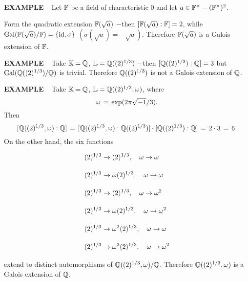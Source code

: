 \vspace{0.1cm}

\begin{x}{\small\bf EXAMPLE} \ %
Let $\mathbb{F}$ be a field of characteristic 0 and let $a \in \mathbb{F}^\times - (\mathbb{F}^\times)^2$.

Form the quadratic extension $\mathbb{F}(\sqrt{a})$ $-$then $[\mathbb{F}(\sqrt{a}):\mathbb{F}] = 2$, while 
$\text{Gal}(\mathbb{F}(\sqrt{a}) / \mathbb{F}) = \{\text{id},\sigma\}$ $(\sigma(\sqrt{a}) = - \sqrt{a})$.  
Therefore $\mathbb{F}(\sqrt{a})$ is a Galois extension of $\mathbb{F}$.
\end{x}

\vspace{0.1cm}

\begin{x}{\small\bf EXAMPLE} \ %
Take $\mathbb{K} = \mathbb{Q}$, $\mathbb{L} = \mathbb{Q}((2)^{1/3})$ $-$then $[\mathbb{Q}((2)^{1/3}):\mathbb{Q}] = 3$ but 
$\text{Gal}(\mathbb{Q}((2)^{1/3}) / \mathbb{Q})$ is trivial.  Therefore $\mathbb{Q}((2)^{1/3})$ is not a Galois extension of $\mathbb{Q}$.
\end{x}

\vspace{0.1cm}

\begin{x}{\small\bf EXAMPLE} \ %
Take $\mathbb{K} = \mathbb{Q}$, $\mathbb{L} = \mathbb{Q}((2)^{1/3}, \omega)$, where 
\[
\omega \hspace{0.05cm} = \hspace{0.05cm} \exp(2 \pi \sqrt{-1} / 3).
\]
Then
\[
[\mathbb{Q}((2)^{1/3}, \omega):\mathbb{Q}] \hspace{0.05cm} = \hspace{0.05cm}  
[\mathbb{Q}((2)^{1/3}, \omega):\mathbb{Q}((2)^{1/3})]  \cdot [\mathbb{Q}((2)^{1/3}):\mathbb{Q}] \hspace{0.05cm} = \hspace{0.05cm}
2 \cdot 3 \hspace{0.05cm} = \hspace{0.05cm} 6.
\]
On the other hand, the six functions 
\begin{align*}
&\vsy(2)^{1/3} \ra (2)^{1/3}, \quad \omega \ra \omega\\
&\vsy(2)^{1/3} \ra \omega(2)^{1/3}, \quad \omega \ra \omega\\
&\vsy(2)^{1/3} \ra (2)^{1/3}, \quad \omega \ra \omega^2\\
&\vsy(2)^{1/3} \ra \omega(2)^{1/3}, \quad \omega \ra \omega^2\\
&\vsy(2)^{1/3} \ra \omega^2 (2)^{1/3}, \quad \omega \ra \omega\\
&\vsy(2)^{1/3} \ra \omega^2 (2)^{1/3}, \quad \omega \ra \omega^2
\end{align*}
extend to distinct automorphisms of $\mathbb{Q}((2)^{1/3}, \omega) /\mathbb{Q}$.
Therefore $\mathbb{Q}((2)^{1/3}, \omega)$ is a Galois extension of $\mathbb{Q}$.
\end{x}

\vspace{0.1cm}

